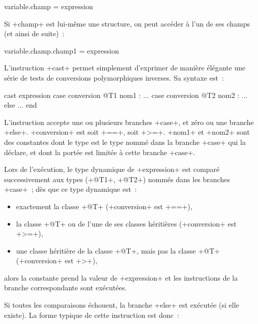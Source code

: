 \begin{galgasbox}
variable.champ = expression
\end{galgasbox}

Si \ggs+champ+ est lui-même une structure, on peut accéder à l'un de ses champs (et ainsi de suite)~:

\begin{galgasbox}
variable.champ.champ1 = expression
\end{galgasbox}














L'instruction \ggs+cast+ permet simplement d'exprimer de manière élégante une série de tests de conversions polymorphiques inverses. Sa syntaxe est~:

\begin{galgasbox}
cast expression
case conversion @T1 nom1 :
  ...
case conversion @T2 nom2 :
  ...
else
  ...
end
\end{galgasbox}

L'instruction accepte une ou plusieurs branches \ggs+case+, et zéro ou une branche \ggs+else+. \ggs+conversion+ est soit \ggs+==+, soit \ggs+>=+. \ggs+nom1+ et \ggs+nom2+ sont des constantes dont le type est le type nommé dans la branche \ggs+case+ qui la déclare, et dont la portée est limitée à cette branche \ggs+case+.

Lors de l'exécution, le type dynamique de \ggs+expression+ est comparé successivement aux types (\ggs+@T1+, \ggs+@T2+) nommés dans les branches \ggs+case+~; dès que ce type dynamique est~:
\begin{itemize}
  \item exactement la classe \ggs+@T+ (\ggs+conversion+ est \ggs+==+), 
  \item la classe \ggs+@T+ ou de l'une de ses classes héritières (\ggs+conversion+ est \ggs+>=+),
  \item une classe héritière de la classe \ggs+@T+, mais pas la classe \ggs+@T+ (\ggs+conversion+ est \ggs+>+),
\end{itemize}
alors la constante prend la valeur de \ggs+expression+ et les instructions de la branche correspondante sont exécutées.

Si toutes les comparaisons échouent, la branche \ggs+else+ est exécutée (si elle existe). La forme typique de cette instruction est donc~:


